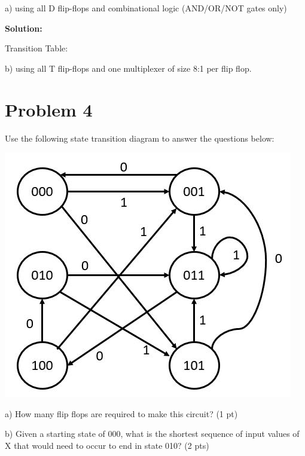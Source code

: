 \documentclass{article}
\begin{document}
    a) using all D flip-flops and combinational logic (AND/OR/NOT gates only)

    \textbf{Solution:}

    Transition Table:

    \begin{center}
        \begin{tabular} 
            
        \end{tabular}
    \end{center}

    b) using all T flip-flops and one multiplexer of size 8:1 per flip flop.


    \section*{Problem 4}

    Use the following state transition diagram to answer the questions below:

    \begin{center}
        \includegraphics{HW5_04_StateDiagram.jpg}
    \end{center}

    a) How many flip flops are required to make this circuit? (1 pt)

    b) Given a starting state of 000, what is the shortest sequence of input values of X that would need to occur to end in state 010? (2 pts)
\end{document}
